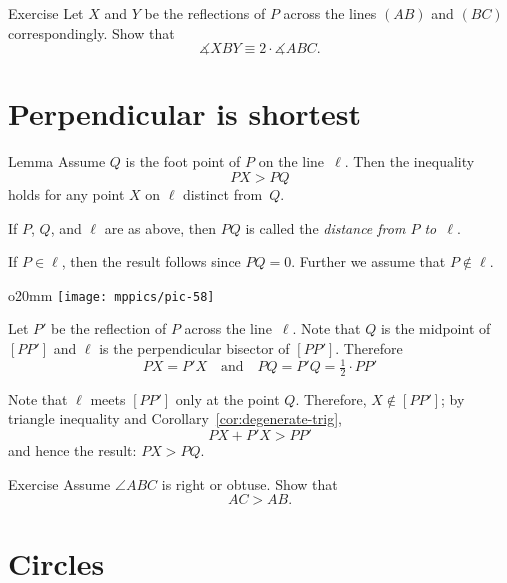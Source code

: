 \begin{thm}{Exercise}\label{ex:2-reflections}
Let $X$ and $Y$ be the reflections of $P$ across the lines $(AB)$ and $(BC)$ correspondingly.
Show that 
$$\measuredangle XBY\equiv 2\cdot \measuredangle ABC.$$

\end{thm}

\section*{Perpendicular is shortest}

\begin{thm}[\abs]{Lemma}\label{lem:perp<oblique}
Assume $Q$ is the foot point of $P$ on the line~$\ell$.
Then the inequality
$$PX>PQ$$
holds for any point $X$ on $\ell$ distinct from~$Q$. 
\end{thm}

If $P$, $Q$, and $\ell$ are as above, 
then $PQ$ is called the \label{distance!from a point to a line}\emph{distance from $P$ to~$\ell$}. 

If $P\in \ell$, 
then the result follows since $PQ=0$.
Further we assume that $P\notin \ell$.

\begin{wrapfigure}{o}{20mm}
\centering
\texttt{[image: mppics/pic-58]}
\end{wrapfigure}

Let $P'$ be the reflection of $P$ across the line~$\ell$.
Note that $Q$ is the midpoint of $[PP']$
and $\ell$ is the perpendicular bisector of $[PP']$.
Therefore
$$PX=P'X
\quad
\text{and}
\quad
PQ=P'Q=\tfrac12\cdot PP'$$

Note that $\ell$ meets $[PP']$ only at the point $Q$.
Therefore, $X\notin [PP']$; by triangle inequality and Corollary~\ref{cor:degenerate-trig},
$$PX+P'X>PP'$$
and hence the result: $PX>PQ$.
\qeds

\begin{thm}{Exercise}\label{ex:obtuce}
Assume $\angle ABC$ is right or obtuse.
Show that 
\[AC>AB.\]

\end{thm}






\section*{Circles}


